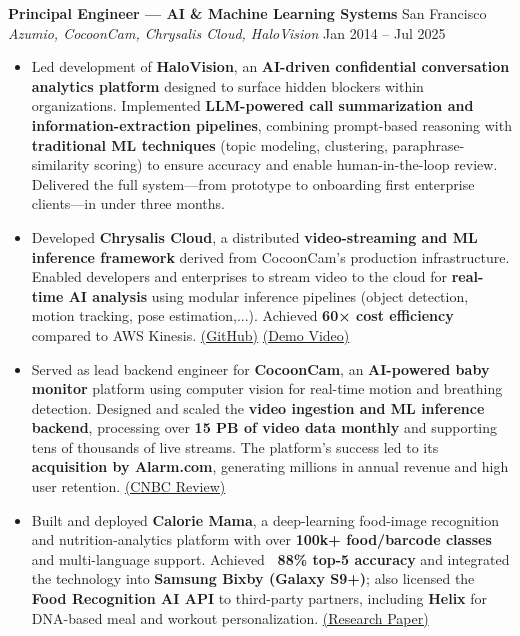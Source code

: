 \documentclass[11pt]{article}
\begin{document}
\textbf{Principal Engineer — AI \& Machine Learning Systems} \hfill San Francisco\\
\textit{Azumio, CocoonCam, Chrysalis Cloud, HaloVision} \hfill Jan 2014 -- Jul 2025
\begin{itemize}
 \item Led development of \textbf{HaloVision}, an \textbf{AI-driven confidential conversation analytics platform} designed to surface hidden blockers within organizations. 
Implemented \textbf{LLM-powered call summarization and information-extraction pipelines}, combining prompt-based reasoning with \textbf{traditional ML techniques} (topic modeling, clustering, paraphrase-similarity scoring) to ensure accuracy and enable human-in-the-loop review. 
Delivered the full system—from prototype to onboarding first enterprise clients—in under three months.
 \item Developed \textbf{Chrysalis Cloud}, a distributed \textbf{video-streaming and ML inference framework} derived from CocoonCam’s production infrastructure. 
Enabled developers and enterprises to stream video to the cloud for \textbf{real-time AI analysis} using modular inference pipelines (object detection, motion tracking, pose estimation,...). 
Achieved \textbf{60× cost efficiency} compared to AWS Kinesis. 
\href{https://github.com/igorrendulic/video-edge-ai-proxy}{(GitHub)} \href{https://www.youtube.com/watch?v=bWCgTW2Ar5s}{(Demo Video)}
 \item Served as lead backend engineer for \textbf{CocoonCam}, an \textbf{AI-powered baby monitor} platform using computer vision for real-time motion and breathing detection. 
Designed and scaled the \textbf{video ingestion and ML inference backend}, processing over \textbf{15 PB of video data monthly} and supporting tens of thousands of live streams. 
The platform’s success led to its \textbf{acquisition by Alarm.com}, generating millions in annual revenue and high user retention. 
\href{https://www.cnbc.com/2018/06/13/cocoon-cam-review-a-smart-baby-monitor-that-detects-breathing.html}{(CNBC Review)}
    \item Built and deployed \textbf{Calorie Mama}, a deep-learning food-image recognition and nutrition-analytics platform with over \textbf{100k+ food/barcode classes} and multi-language support. 
Achieved \textbf{~88\% top-5 accuracy} and integrated the technology into \textbf{Samsung Bixby (Galaxy S9+)}; also licensed the \textbf{Food Recognition AI API} to third-party partners, including \textbf{Helix} for DNA-based meal and workout personalization. 
\href{https://www.mdpi.com/2072-6643/13/11/4132?type=check_update&version=2}{(Research Paper)}
\end{itemize}
\end{document}
